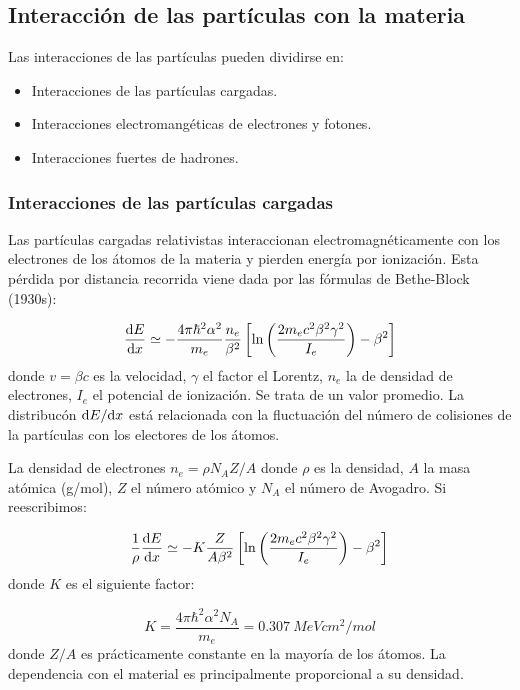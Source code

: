 \subsection{Interacción de las partículas con la materia}

Las interacciones de las partículas pueden dividirse en:

\begin{itemize}
	\item Interacciones de las partículas cargadas.
	\item Interacciones electromangéticas de electrones y fotones.
	\item Interacciones fuertes de hadrones.
\end{itemize}

\subsubsection{Interacciones de las partículas cargadas}

Las partículas cargadas relativistas interaccionan electromagnéticamente con los electrones de los átomos de la materia y pierden energía por ionización. Esta pérdida por distancia recorrida viene dada por las fórmulas de Bethe-Block (1930s):

\begin{equation}
	\frac{\mathrm{d} E}{\mathrm{d} x} \simeq - \frac{4\pi \hbar^2 \alpha^2}{m_e} \frac{n_e}{\beta^2} \left[ \ln \left( \frac{2m_e c^2 \beta^2 \gamma^2}{I_e} \right) - \beta^2 \right]
\end{equation}
donde $v=\beta c$ es la velocidad, $\gamma$ el factor el Lorentz, $n_e$ la de densidad de electrones, $I_e$ el potencial de ionización. Se trata de un valor promedio. La distribucón $\mathrm{d} E / \mathrm{d} x$ está relacionada con la fluctuación del número de colisiones de la partículas con los electores de los átomos.

La densidad de electrones $n_e=\rho N_A Z/A$ donde $\rho$ es la densidad, $A$ la masa atómica (g/mol), $Z$ el número atómico y $N_A$ el número de Avogadro. Si reescribimos:

\begin{equation}
	\frac{1}{\rho} \frac{\mathrm{d} E}{\mathrm{d} x} \simeq - K \frac{Z}{A\beta^2} \left[ \ln \left( \frac{2m_ec^2\beta^2 \gamma^2}{I_e} \right) - \beta^2 \right]
\end{equation}
donde $K$ es el siguiente factor:

\begin{equation}
	K = \frac{4\pi \hbar^2 \alpha^2 N_A}{m_e} = 0.307 \ \unit{MeV cm^2 / mol}
\end{equation}
donde $Z/A$ es prácticamente constante en la mayoría de los átomos. La dependencia con el material es principalmente proporcional a su densidad. 

